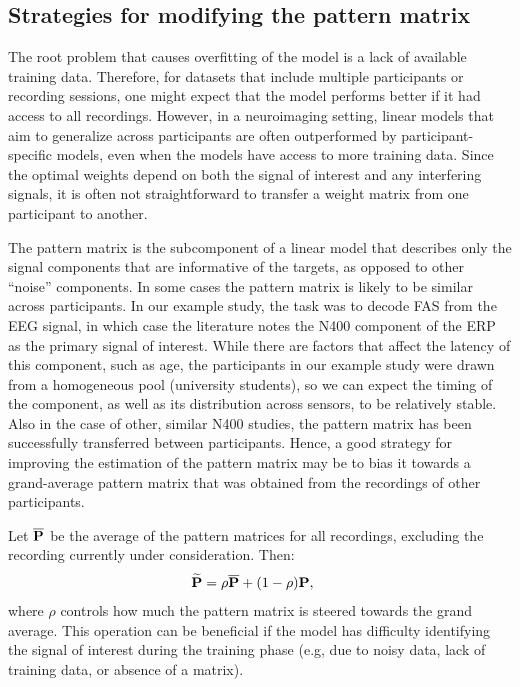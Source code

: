 \documentclass[a4paper]{vanvliet_paper}
\newcommand{\modpat}{\widetilde{\mat{P}}}
\begin{document}
\subsection{Strategies for modifying the pattern matrix}\label{sec:modpat}

The root problem that causes overfitting of the model is a lack of available training data.
Therefore, for datasets that include multiple participants or recording sessions, one might expect that the model performs better if it had access to all recordings.
However, in a neuroimaging setting, linear models that aim to generalize across participants are often outperformed by participant-specific models, even when the models have access to more training data\cite{Reuderink2011, Lotte2009, Fazli2009}.
Since the optimal weights depend on both the signal of interest and any interfering signals, it is often not straightforward to transfer a weight matrix from one participant to another.

The pattern matrix  is the subcomponent of a linear model that describes only the signal components that are informative of the targets, as opposed to other ``noise'' components.
In some cases the pattern matrix is likely to be similar across participants.
In our example study, the task was to decode \gls{FAS} from the \gls{EEG} signal, in which case the literature notes the N400 component of the \gls{ERP}\cite{Kutas1980, Kutas2011} as the primary signal of interest.
While there are factors that affect the latency of this component, such as age\cite{Kutas1998}, the participants in our example study were drawn from a homogeneous pool (university students), so we can expect the timing of the component, as well as its distribution across sensors, to be relatively stable.
Also in the case of other, similar N400 studies, the pattern matrix has been successfully transferred between participants\cite{VanVliet2016a, VanVliet2018}.
Hence, a good strategy for improving the estimation of the pattern matrix may be to bias it towards a grand-average pattern matrix that was obtained from the recordings of other participants.

Let $\overline{\mathbf{P}}$ be the average of the pattern matrices for all recordings, excluding the recording currently under consideration. Then:
\begin{align}
    \modpat &= \rho \overline{\mat{P}} + (1 - \rho) \mat{P},
\end{align}
where $\rho$ controls how much the pattern matrix is steered towards the grand average.
This operation can be beneficial if the model has difficulty identifying the signal of interest during the training phase (e.g, due to noisy data, lack of training data, or absence of a  matrix\cite{VanVliet2018}).
\end{document}
